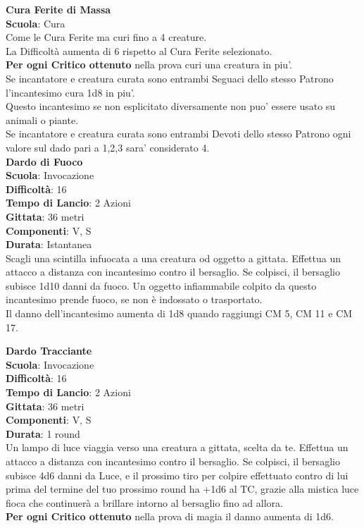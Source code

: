 \begin{multicols}{2}
\medskip\textbf{Cura Ferite di Massa}\\
\textbf{Scuola}: Cura\\
Come le Cura Ferite ma curi fino a 4 creature.\\
La Difficoltà aumenta di 6 rispetto al Cura Ferite selezionato.\\
\textbf{Per ogni Critico ottenuto} nella prova curi una creatura in piu'.\\
Se incantatore e creatura curata sono entrambi Seguaci dello stesso Patrono l'incantesimo cura 1d8 in piu'.\\
Questo incantesimo se non esplicitato diversamente non puo' essere usato su animali o piante.\\
Se incantatore e creatura curata sono entrambi Devoti dello stesso Patrono ogni valore sul dado pari a 1,2,3 sara' considerato 4.\\

\medskip\textbf{Dardo di Fuoco}\\
\textbf{Scuola}: Invocazione\\
\textbf{Difficoltà}: 16\\
\textbf{Tempo di Lancio}: 2 Azioni\\
\textbf{Gittata}: 36 metri\\
\textbf{Componenti}: V, S\\
\textbf{Durata}: Istantanea\\
Scagli una scintilla infuocata a una creatura od oggetto a gittata. Effettua un attacco a distanza con incantesimo contro il bersaglio. Se colpisci, il bersaglio subisce 1d10 danni da fuoco. Un oggetto infiammabile colpito da questo incantesimo prende fuoco, se non è indossato o trasportato.\\
Il danno dell'incantesimo aumenta di 1d8 quando raggiungi CM 5, CM 11 e CM 17.

\medskip\textbf{Dardo Tracciante}\\
\textbf{Scuola}: Invocazione\\
\textbf{Difficoltà}: 16\\
\textbf{Tempo di Lancio}: 2 Azioni\\
\textbf{Gittata}: 36 metri\\
\textbf{Componenti}: V, S\\
\textbf{Durata}: 1 round\\
Un lampo di luce viaggia verso una creatura a gittata, scelta da te. Effettua un attacco a distanza con incantesimo contro il bersaglio. Se colpisci, il bersaglio subisce 4d6 danni da Luce, e il prossimo tiro per colpire effettuato contro di lui prima del termine del tuo
prossimo round ha +1d6 al TC, grazie alla mistica luce fioca che continuerà a brillare intorno al bersaglio fino ad allora.\\
\textbf{Per ogni Critico ottenuto} nella prova di magia il danno aumenta di 1d6.


\end{multicols}
